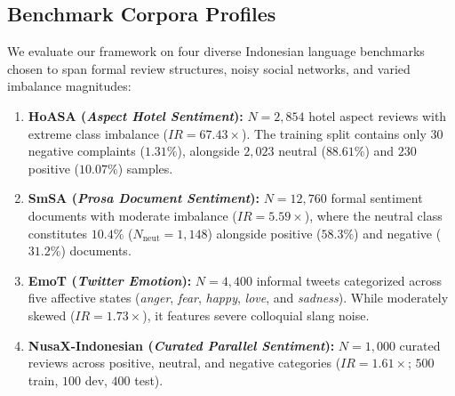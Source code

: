 \documentclass[final,5p,times,twocolumn]{elsarticle}
\begin{document}
\subsection{Benchmark Corpora Profiles}
We evaluate our framework on four diverse Indonesian language benchmarks \cite{wilie2020indonlu, koto2020indolem, koto2021indobertweet, cahyawijaya2023nusacrowd, winata2023nusax} chosen to span formal review structures, noisy social networks, and varied imbalance magnitudes:
\begin{enumerate}
    \item \textbf{HoASA (\textit{Aspect Hotel Sentiment}):} $N=2,854$ hotel aspect reviews with extreme class imbalance ($IR = 67.43\times$). The training split contains only 30 negative complaints ($1.31\%$), alongside $2,023$ neutral ($88.61\%$) and $230$ positive ($10.07\%$) samples.
    \item \textbf{SmSA (\textit{Prosa Document Sentiment}):} $N=12,760$ formal sentiment documents with moderate imbalance ($IR = 5.59\times$), where the neutral class constitutes $10.4\%$ ($N_{\text{neut}} = 1,148$) alongside positive ($58.3\%$) and negative ($31.2\%$) documents.
    \item \textbf{EmoT (\textit{Twitter Emotion}):} $N=4,400$ informal tweets categorized across five affective states (\textit{anger}, \textit{fear}, \textit{happy}, \textit{love}, and \textit{sadness}). While moderately skewed ($IR = 1.73\times$), it features severe colloquial slang noise.
    \item \textbf{NusaX-Indonesian (\textit{Curated Parallel Sentiment}):} $N=1{,}000$ curated reviews across positive, neutral, and negative categories ($IR = 1.61\times$; $500$ train, $100$ dev, $400$ test).
\end{enumerate}

\begin{table}[!t]
\caption{Comprehensive performance comparison across all four benchmark corpora against state-of-the-art imbalance baselines and loss formulations. Statistical significance is evaluated via paired two-tailed $t$-tests and Wilcoxon signed-rank tests across 5-fold cross-validation runs.}
\label{tab:main_results}
\centering
\footnotesize
\setlength{\tabcolsep}{2.8pt}

\end{table}
\end{document}

